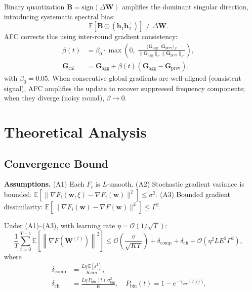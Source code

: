 \documentclass[conference]{IEEEtran}
\begin{document}
Binary quantization $\mathbf{B} = \mathrm{sign}(\Delta\mathbf{W})$ amplifies the dominant singular direction, introducing systematic spectral bias:
\begin{equation}
    \mathbb{E}\!\left[\mathbf{B} \odot \left(\mathbf{h}_1\mathbf{h}_2^\top\right)\right] \neq \Delta\mathbf{W}.
\end{equation}
AFC corrects this using inter-round gradient consistency:
\begin{align}
    \beta(t) &= \beta_0 \cdot \max\!\left(0,\; \frac{\langle \mathbf{G}_{\mathrm{agg}},\, \mathbf{G}_{\mathrm{prev}}\rangle_F}{\|\mathbf{G}_{\mathrm{agg}}\|_F \|\mathbf{G}_{\mathrm{prev}}\|_F}\right), \\
    \mathbf{G}_{\mathrm{cal}} &= \mathbf{G}_{\mathrm{agg}} + \beta(t)\left(\mathbf{G}_{\mathrm{agg}} - \mathbf{G}_{\mathrm{prev}}\right),
\end{align}
with $\beta_0 = 0.05$. When consecutive global gradients are well-aligned (consistent signal), AFC amplifies the update to recover suppressed frequency components; when they diverge (noisy round), $\beta \to 0$.

\section{Theoretical Analysis}

\subsection{Convergence Bound}

\textbf{Assumptions.} (A1) Each $F_i$ is $L$-smooth. (A2) Stochastic gradient variance is bounded: $\mathbb{E}[\|\nabla F_i(\mathbf{w},\xi) - \nabla F_i(\mathbf{w})\|^2] \leq \sigma^2$. (A3) Bounded gradient dissimilarity: $\mathbb{E}[\|\nabla F_i(\mathbf{w}) - \nabla F(\mathbf{w})\|^2] \leq \Gamma^2$.

\begin{theorem}
Under (A1)--(A3), with learning rate $\eta = \mathcal{O}(1/\sqrt{T})$:
\begin{equation}
    \frac{1}{T}\sum_{t=0}^{T-1}\mathbb{E}\!\left[\left\|\nabla F(\mathbf{W}^{(t)})\right\|^2\right]
    \leq \mathcal{O}\!\left(\frac{\sigma}{\sqrt{KT}}\right) + \delta_{\mathrm{comp}} + \delta_{\mathrm{ch}} + \mathcal{O}\!\left(\eta^2 L E^2 \Gamma^2\right),
\end{equation}
where
\begin{align}
    \delta_{\mathrm{comp}} &= \frac{L\eta\,\mathbb{E}[\varepsilon^2]}{Kmn}, \\
    \delta_{\mathrm{ch}} &= \frac{L\eta\, P_{\mathrm{bin}}(t)\,\sigma_{\mathrm{bin}}^2}{K}, \quad P_{\mathrm{bin}}(t) = 1 - e^{-\gamma_{\mathrm{low}}(t)/\overline{\gamma}}.
\end{align}
\end{theorem}
\end{document}

